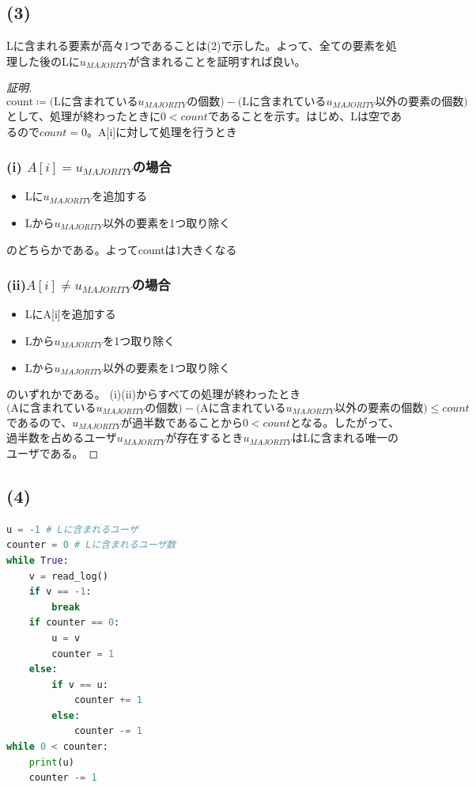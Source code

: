 \documentclass[a4paper,12pt,xelatex,ja=standard]{bxjsarticle}
\begin{document}
\subsection*{(3)}
Lに含まれる要素が高々1つであることは(2)で示した。よって、全ての要素を処理した後のLに$u_{MAJORITY}$が含まれることを証明すれば良い。\\
\begin{proof}[証明]
  \[
    \text{count} \coloneqq \text{(Lに含まれている$u_{MAJORITY}$の個数)} - \text{(Lに含まれている$u_{MAJORITY}$以外の要素の個数)}
  \]
  として、処理が終わったときに$0 < count$であることを示す。はじめ、Lは空であるので$count = 0$。A[i]に対して処理を行うとき\\
  \subsubsection*{(i) $A[i] = u_{MAJORITY}$の場合}
  \begin{itemize}
    \item Lに$u_{MAJORITY}$を追加する
    \item Lから$u_{MAJORITY}$以外の要素を1つ取り除く
  \end{itemize}
  のどちらかである。よってcountは1大きくなる
  \subsubsection*{(ii)$A[i] \neq u_{MAJORITY}$の場合}
  \begin{itemize}
    \item LにA[i]を追加する
    \item Lから$u_{MAJORITY}$を1つ取り除く
    \item Lから$u_{MAJORITY}$以外の要素を1つ取り除く
  \end{itemize}
  のいずれかである。
  (i)(ii)からすべての処理が終わったとき
  \[
    \text{(Aに含まれている$u_{MAJORITY}$の個数)} - \text{(Aに含まれている$u_{MAJORITY}$以外の要素の個数)} \leq count
  \]
  であるので、$u_{MAJORITY}$が過半数であることから$0 < count$となる。したがって、過半数を占めるユーザ$u_{MAJORITY}$が存在するとき$u_{MAJORITY}$はLに含まれる唯一のユーザである。
\end{proof}

\subsection*{(4)}
\begin{lstlisting}[language=Python]
u = -1 # Lに含まれるユーザ
counter = 0 # Lに含まれるユーザ数
while True:
    v = read_log()
    if v == -1:
        break
    if counter == 0:
        u = v
        counter = 1
    else:
        if v == u:
            counter += 1
        else:
            counter -= 1
while 0 < counter:
    print(u)
    counter -= 1
\end{lstlisting}
\end{document}
